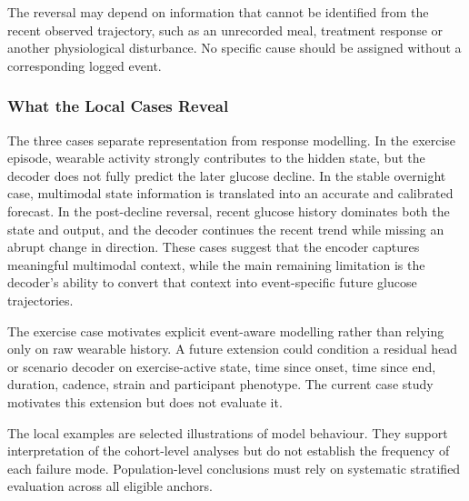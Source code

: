 The reversal may depend on information that cannot be identified from the
recent observed trajectory, such as an unrecorded meal, treatment response or
another physiological disturbance. No specific cause should be assigned without
a corresponding logged event.

\subsubsection{What the Local Cases Reveal}
\label{subsec:interp_case_synthesis}

The three cases separate representation from response modelling. In the
exercise episode, wearable activity strongly contributes to the hidden state,
but the decoder does not fully predict the later glucose decline. In the
stable overnight case, multimodal state information is translated into an
accurate and calibrated forecast. In the post-decline reversal, recent glucose
history dominates both the state and output, and the decoder continues the
recent trend while missing an abrupt change in direction. These cases suggest
that the encoder captures meaningful multimodal context, while the main
remaining limitation is the decoder's ability to convert that context into
event-specific future glucose trajectories.

The exercise case motivates explicit event-aware modelling rather than relying
only on raw wearable history. A future extension could condition a residual
head or scenario decoder on exercise-active state, time since onset, time since
end, duration, cadence, strain and participant phenotype. The current case
study motivates this extension but does not evaluate it.

The local examples are selected illustrations of model behaviour. They support
interpretation of the cohort-level analyses but do not establish the frequency
of each failure mode. Population-level conclusions must rely on systematic
stratified evaluation across all eligible anchors.
